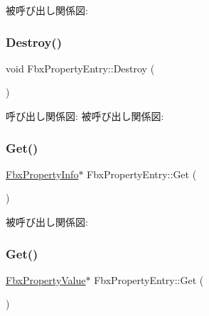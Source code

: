 被呼び出し関係図\+:
\mbox{\label{class_fbx_property_entry_af8621889726e9c80d78bfabc039720dc}} 
\subsubsection{\texorpdfstring{Destroy()}{Destroy()}}
{\footnotesize\ttfamily void Fbx\+Property\+Entry\+::\+Destroy (\begin{DoxyParamCaption}{ }\end{DoxyParamCaption})}

呼び出し関係図\+:
被呼び出し関係図\+:
\mbox{\label{class_fbx_property_entry_ae91a2951a81cd0906ffa15c6d7c9abe4}} 
\subsubsection{\texorpdfstring{Get()}{Get()}\hspace{0.1cm}{\footnotesize\ttfamily [1/4]}}
{\footnotesize\ttfamily \hyperlink{class_fbx_property_info}{Fbx\+Property\+Info}$\ast$ Fbx\+Property\+Entry\+::\+Get (\begin{DoxyParamCaption}\item[{const \hyperlink{class_fbx_property_info}{Fbx\+Property\+Info} $\ast$}]{ }\end{DoxyParamCaption})}

被呼び出し関係図\+:
\mbox{\label{class_fbx_property_entry_a61efc16c6ef16db699eb98349d8a80db}} 
\subsubsection{\texorpdfstring{Get()}{Get()}\hspace{0.1cm}{\footnotesize\ttfamily [2/4]}}
{\footnotesize\ttfamily \hyperlink{class_fbx_property_value}{Fbx\+Property\+Value}$\ast$ Fbx\+Property\+Entry\+::\+Get (\begin{DoxyParamCaption}\item[{const \hyperlink{class_fbx_property_value}{Fbx\+Property\+Value} $\ast$}]{ }\end{DoxyParamCaption})}


